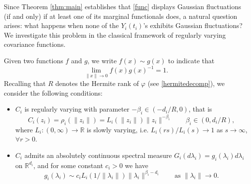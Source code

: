 \documentclass[12pt]{article}
\DeclareMathOperator{\1}{1}
\newcommand{\R}{\mathbb{R}}
\theoremstyle{plain}
\theoremstyle{definition}
\begin{document}
Since Theorem \ref{thm:main} establishes that \eqref{func} displays Gaussian fluctuations (if and only) if at least one of its marginal functionals does, a natural question arises: what happens when none of the $Y_i(t_i)$'s exhibits Gaussian fluctuations? We investigate this problem in the classical framework of regularly varying covariance functions.

Given two functions $f$ and $g$, we write $f(x)\sim g(x)$ to indicate that \begin{equation}
    \lim_{\|x\|\to 0} f(x)g(x)^{-1}=1.
\end{equation}
Recalling that $R$ denotes the Hermite rank of $\varphi$ (see \eqref{hermitedecomp}), we consider the following conditions:
\begin{itemize}
    \item $C_i$ is {regularly varying} with parameter $-\beta_i \in(-d_i/R,0)$, that is \begin{equation}
 \label{equ:regvar} C_i(z_i)=\rho_i(\|z_i\|)=L_i(\|z_i\|)\|z_i\|^{-\beta_i}\quad \quad \beta_i\in(0,d_i/R),
\end{equation}
where $L_i:(0,\infty)\rightarrow \R$ is slowly varying, i.e. $L_i(rs)/L_i(s)\rightarrow 1$ as $s\rightarrow\infty$, $\forall r>0$.
\item $C_i$ admits an absolutely continuous spectral measure $G_i(d\lambda_i)=g_i(\lambda_i)d\lambda_i$ on $\R^{d_i}$, and for some constant $c_i>0$ we have
\begin{equation}
 \label{equ:regspec}
 g_i(\lambda_i) \sim c_iL_i(1/\|\lambda_i\|) \|\lambda_i\|^{\beta_i-d_i} \quad \quad\text{as }\|\lambda_i\|\rightarrow 0.
 \end{equation}
\end{itemize}
\end{document}
